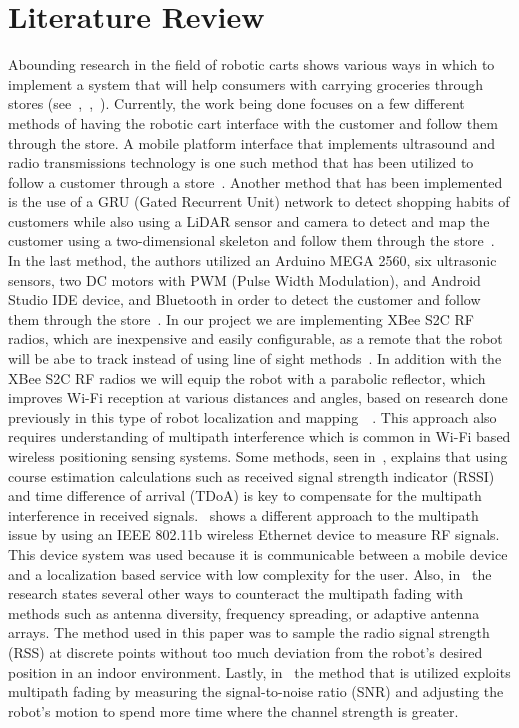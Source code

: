 \documentclass[letterpaper,12pt]{article}   %
\begin{document}
\section{Literature Review} %

Abounding research in the field of robotic carts shows various ways in which to implement a system that will help consumers with carrying groceries through stores (see~\cite{inproceedings},~\cite{islam_lam_fukuda_kobayashi_kuno_2019},~\cite{article}). Currently, the work being done focuses on a few different methods of having the robotic cart interface with the customer and follow them through the store. A mobile platform interface that implements ultrasound and radio transmissions technology is one such method that has been utilized to follow a customer through a store~\cite{article}. Another method that has been implemented is the use of a GRU (Gated Recurrent Unit) network to detect shopping habits of customers while also using a LiDAR sensor and camera to detect and map the customer using a two-dimensional skeleton and follow them through the store~\cite{islam_lam_fukuda_kobayashi_kuno_2019}. In the last method, the authors utilized an Arduino MEGA 2560, six ultrasonic sensors, two DC motors with PWM (Pulse Width Modulation), and Android Studio IDE device, and Bluetooth in order to detect the customer and follow them through the store~\cite{inproceedings}. In our project we are implementing XBee S2C RF radios, which are inexpensive and easily configurable, as a remote that the robot will be abe to track instead of using line of sight methods~\cite{8168364}. In addition with the XBee S2C RF radios we will equip the robot with a parabolic reflector, which improves Wi-Fi reception at various distances and angles, based on research done previously in this type of robot localization and mapping~\cite{8168364}~\cite{Li2013ANA}. This approach also requires understanding of multipath interference which is common in Wi-Fi based wireless positioning sensing systems. Some methods, seen in~\cite{xie_jiang_zhao_zhang_2019}, explains that using course estimation calculations such as received signal strength indicator (RSSI) and time difference of arrival (TDoA) is key to compensate for the multipath interference in received signals.~\cite{ladd_bekris_rudys_kavraki_wallach_2005} shows a different approach to the multipath issue by using an IEEE 802.11b wireless Ethernet device to measure RF signals. This device system was used because it is communicable between a mobile device and a localization based service with low complexity for the user. Also, in~\cite{lindhe_johansson_bicchi_2007} the research states several other ways to counteract the multipath fading with methods such as antenna diversity, frequency spreading, or adaptive antenna arrays. The method used in this paper was to sample the radio signal strength (RSS) at discrete points without too much deviation from the robot's desired position in an indoor environment. Lastly, in~\cite{Lindhe2009} the method that is utilized exploits multipath fading by measuring the signal-to-noise ratio (SNR) and adjusting the robot's motion to spend more time where the channel strength is greater.
\end{document}
